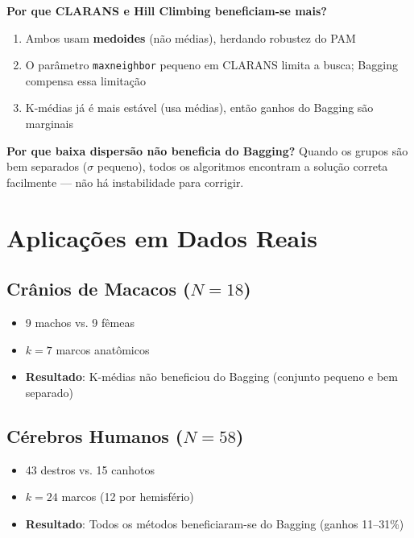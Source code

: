 \documentclass[12pt,a4paper]{article}
\theoremstyle{definition}
\begin{document}
\begin{tcolorbox}[caixaimportante={Interpretação dos Resultados}]
\textbf{Por que CLARANS e Hill Climbing beneficiam-se mais?}
\begin{enumerate}
    \item Ambos usam \textbf{medoides} (não médias), herdando robustez do PAM
    \item O parâmetro \texttt{maxneighbor} pequeno em CLARANS limita a busca; Bagging compensa essa limitação
    \item K-médias já é mais estável (usa médias), então ganhos do Bagging são marginais
\end{enumerate}

\textbf{Por que baixa dispersão não beneficia do Bagging?}
Quando os grupos são bem separados ($\sigma$ pequeno), todos os algoritmos encontram a solução correta facilmente --- não há instabilidade para corrigir.
\end{tcolorbox}

\section{Aplicações em Dados Reais}

\subsection{Crânios de Macacos ($N=18$)}

\begin{itemize}
    \item 9 machos vs.
9 fêmeas
    \item $k=7$ marcos anatômicos
    \item \textbf{Resultado}: K-médias não beneficiou do Bagging (conjunto pequeno e bem separado)
\end{itemize}

\subsection{Cérebros Humanos ($N=58$)}

\begin{itemize}
    \item 43 destros vs.
15 canhotos
    \item $k=24$ marcos (12 por hemisfério)
    \item \textbf{Resultado}: Todos os métodos beneficiaram-se do Bagging (ganhos 11--31\%)
\end{itemize}
\end{document}
